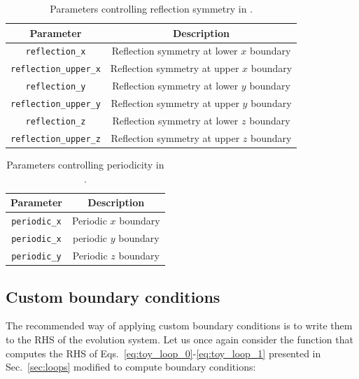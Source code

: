 \begin{table}[ht]
  \centering
  \begin{tabular}{cc}
  Parameter                     & Description                             \\\hline\hline
  \texttt{reflection\_x}        & Reflection symmetry at lower $x$ boundary\\
  \texttt{reflection\_upper\_x} & Reflection symmetry at upper $x$ boundary\\
  \texttt{reflection\_y}        & Reflection symmetry at lower $y$ boundary\\
  \texttt{reflection\_upper\_y} & Reflection symmetry at upper $y$ boundary\\
  \texttt{reflection\_z}        & Reflection symmetry at lower $z$ boundary\\
  \texttt{reflection\_upper\_z} & Reflection symmetry at upper $z$ boundary\\\hline\hline
  \end{tabular}
  \caption{Parameters controlling reflection symmetry in \CarpetX.}
  \label{tab:reflection_params}
\end{table}

\begin{table}[ht]
  \centering
  \begin{tabular}{cc}
  Parameter            & Description          \\\hline\hline
  \texttt{periodic\_x} & Periodic $x$ boundary\\
  \texttt{periodic\_x} & periodic $y$ boundary\\
  \texttt{periodic\_y} & Periodic $z$ boundary\\\hline\hline
  \end{tabular}
  \caption{Parameters controlling periodicity in \CarpetX.}
  \label{tab:periodic_params}
\end{table}

\subsection{Custom boundary conditions}

The recommended way of applying custom boundary conditions is to write them to the RHS of the evolution system. Let us once again consider the function that computes the RHS of Eqs.~\eqref{eq:toy_loop_0}-\eqref{eq:toy_loop_1} presented in Sec.~\ref{sec:loops} modified to compute boundary conditions:

